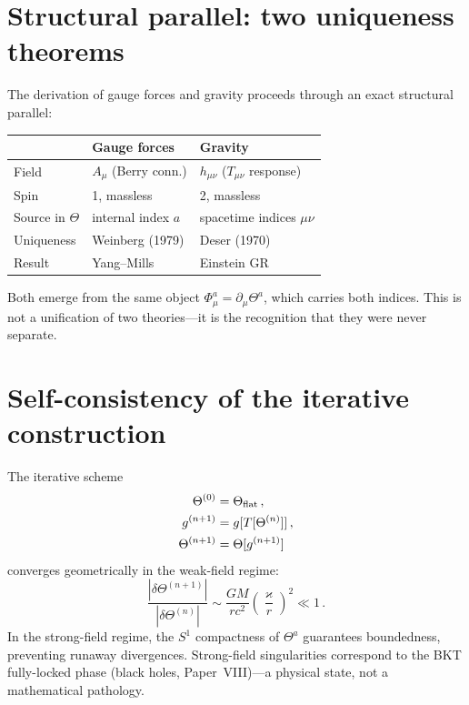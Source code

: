 \documentclass[twocolumn,preprintnumbers,amsmath,amssymb,prd]{revtex4-2}
\begin{document}
\section{Structural parallel: two uniqueness theorems}
\label{sec:parallel}

The derivation of gauge forces and gravity proceeds through an exact structural parallel:

\begin{center}
\begin{tabular}{lll}
\toprule
& Gauge forces & Gravity \\
\midrule
Field & $A_\mu$ (Berry conn.) & $h_{\mu\nu}$ ($T_{\mu\nu}$ response) \\
Spin & 1, massless & 2, massless \\
Source in $\Theta$ & internal index $a$ & spacetime indices $\mu\nu$ \\
Uniqueness & Weinberg (1979) & Deser (1970) \\
Result & Yang--Mills & Einstein GR \\
\bottomrule
\end{tabular}
\end{center}

Both emerge from the same object $\Phi_\mu^a = \partial_\mu\Theta^a$, which carries both indices.
This is not a unification of two theories---it is the recognition that they were never separate.

\section{Self-consistency of the iterative construction}
\label{sec:selfconsistency}

The iterative scheme
\begin{align}
\Theta^{(0)} &= \Theta_{\rm flat}\,, \notag\\
g^{(n+1)} &= g[T[\Theta^{(n)}]]\,, \notag\\
\Theta^{(n+1)} &= \Theta[g^{(n+1)}]
\end{align}
converges geometrically in the weak-field regime:
\begin{equation}
\frac{|\delta\Theta^{(n+1)}|}{|\delta\Theta^{(n)}|} \sim \frac{GM}{rc^2}\left(\frac{\varkappa}{r}\right)^2 \ll 1\,.
\end{equation}
In the strong-field regime, the $S^1$ compactness of $\Theta^a$ guarantees boundedness, preventing runaway divergences.
Strong-field singularities correspond to the BKT fully-locked phase (black holes, Paper~VIII)---a physical state, not a mathematical pathology.
\end{document}
